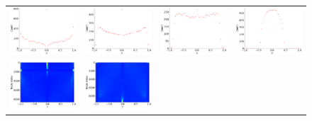 \documentclass[senior,final,11pt]{iscs-thesis}
\begin{document}
\begin{figure}[htbp]
  \setlength\tabcolsep{0pt}
  \hspace{-3.0cm}
  \begin{tabular}{cccc}
    \includegraphics[width=45mm]{figure/gnm_random_graph_n10000_m10000txt_dos.png} &
    \includegraphics[width=45mm]{figure/gnm_random_graph_n10000_m15000txt_dos.png} &
    \includegraphics[width=45mm]{figure/gnm_random_graph_n10000_m20000txt_dos.png} &
    \includegraphics[width=45mm]{figure/gnm_random_graph_n10000_m100000txt_dos.png} \\
    \includegraphics[width=45mm]{figure/gnm_random_graph_n10000_m10000txt_pdos.png} &
    \includegraphics[width=45mm]{figure/gnm_random_graph_n10000_m15000txt_pdos.png} &

\end{tabular}
\end{figure}
\end{document}
